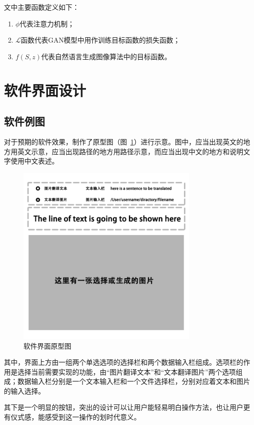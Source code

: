 文中主要函数定义如下：
\begin{enumerate}[fullwidth,itemindent=2em,label=\arabic*.]
    \item $\phi$代表注意力机制；
    \item $\mathcal{L}$函数代表GAN模型中用作训练目标函数的损失函数；
    \item $f(S,z)$代表自然语言生成图像算法中的目标函数。
\end{enumerate}

\section{软件界面设计}
\subsection{软件例图}
对于预期的软件效果，制作了原型图（图~\ref{fig:UIproto}）进行示意。图中，应当出现英文的地方用英文示意，应当出现路径的地方用路径示意，而应当出现中文的地方和说明文字使用中文表述。
\begin{figure}[!htb]
    \centering
    \includegraphics[width=0.8\textwidth]{figures/界面原型图.png}
    \caption{软件界面原型图}
    \label{fig:UIproto}
  \end{figure}

  其中，界面上方由一组两个单选选项的选择栏和两个数据输入栏组成。选项栏的作用是选择当前需要实现的功能，由“图片翻译文本”和“文本翻译图片”两个选项组成；数据输入栏分别是一个文本输入栏和一个文件选择栏，分别对应着文本和图片的输入选择。

  其下是一个明显的按钮，突出的设计可以让用户能轻易明白操作方法，也让用户更有仪式感，能感受到这一操作的划时代意义。

